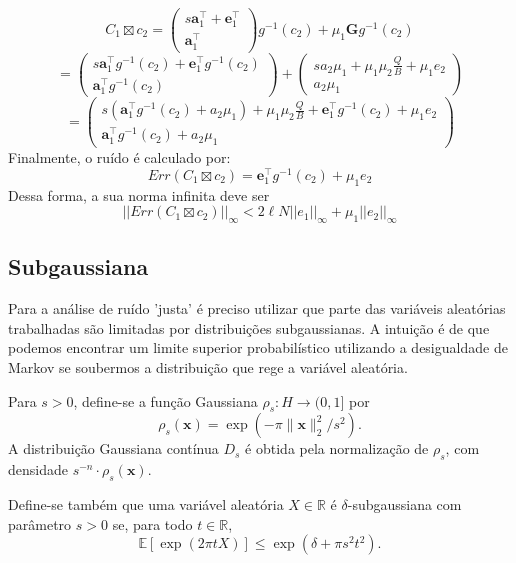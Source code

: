 $$C_1 \boxtimes c_2 = \begin{pmatrix} s \mathbf{a}_1^\top + \mathbf{e}_1^\top \\ \mathbf{a}_ 1^\top \end{pmatrix}g^{-1}(c_2) + \mu_1\mathbf{G}g^{-1}(c_2)$$ 
$$=\begin{pmatrix} s \mathbf{a}_1^\top g^{-1}(c_2) + \mathbf{e}_1^\top g^{-1}(c_2) \\ \mathbf{a}_ 1^\top g^{-1}(c_2) \end{pmatrix} + \begin{pmatrix} s a_2 \mu_1 + \mu_1 \mu_2 \frac{Q}{B} + \mu_1 e_2 \\ a_2 \mu_1 \end{pmatrix} $$
$$=\begin{pmatrix} s ( \mathbf{a}_1^\top g^{-1}(c_2) + a_2\mu_1) + \mu_1\mu_2\frac{Q}{B} +  \mathbf{e}_1^\top g^{-1}(c_2) +\mu_1 e_2 \\ \mathbf{a}_ 1^\top g^{-1}(c_2) + a_2 \mu_1 \end{pmatrix}$$
Finalmente, o ruído é calculado por:
$$
Err(C_1 \boxtimes c_2) = \mathbf{e}_1^\top g^{-1}(c_2) +\mu_1 e_2  
$$
Dessa forma, a sua norma infinita deve ser
$$
||Err(C_1 \boxtimes c_2)||_\infty < 2\ell N||e_1||_\infty + \mu_1 ||e_2||_\infty 
$$

\subsection{Subgaussiana}
Para a análise de ruído 'justa' é preciso utilizar que parte das variáveis aleatórias trabalhadas são limitadas por distribuições 
subgaussianas. A intuição é de que podemos encontrar um limite superior probabilístico utilizando a desigualdade de Markov se soubermos
a distribuição que rege a variável aleatória. 

\begin{definition}
    Para \( s > 0 \), define-se a função Gaussiana \( \rho_s : H \to (0,1] \) por
\[
\rho_s(\mathbf{x}) = \exp\left(-\pi \|\mathbf{x}\|_2^2 / s^2\right).
\]
A distribuição Gaussiana contínua \( D_s \) é obtida pela normalização de \( \rho_s \), com densidade \( s^{-n} \cdot \rho_s(\mathbf{x}) \).

Define-se também que uma variável aleatória \( X \in \mathbb{R} \) é \( \delta \)-subgaussiana com parâmetro \( s > 0 \) se, para todo \( t \in \mathbb{R} \),
\[
\mathbb{E}[\exp(2\pi t X)] \leq \exp(\delta + \pi s^2 t^2).
\]

\end{definition}

